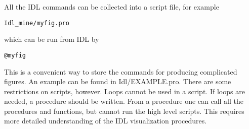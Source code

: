 All the IDL commands can be collected into a script file, for example 
\begin{verbatim}
Idl_mine/myfig.pro
\end{verbatim}
which can be run from IDL by
\begin{verbatim}
@myfig
\end{verbatim}
This is a convenient way to store the commands for producing complicated 
figures. An example can be found in Idl/EXAMPLE.pro. There are some
restrictions on scripts, however. Loops cannot be used in a script.
If loops are needed, a procedure should be written. From a procedure
one can call all the procedures and functions, but cannot run the
high level scripts. This requires more detailed understanding of the 
IDL visualization procedures.

%
